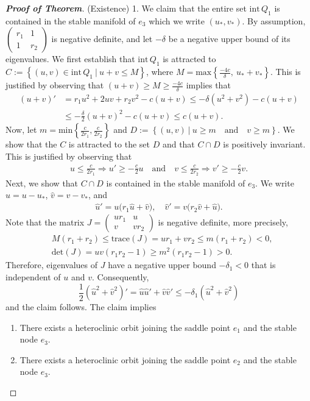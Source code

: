 \documentclass{amsart}
\theoremstyle{definition}
\numberwithin{equation}{section}
\def\ii{{\textrm{int}}\,}
\begin{document}
\begin{proof}[\textbf{Proof of Theorem}]
\bigskip 
(Existence) 1. We claim that the entire set $\ii Q_1$ is contained in the stable manifold of $e_3$ which we write $(u_*,v_*)$. By assumption, $\begin{pmatrix} r_1 & 1 \\ 1 & r_2 \end{pmatrix}$ is negative definite, and let $-\delta$ be a negative upper bound of its eigenvalues. We first establish that $\ii Q_1$ is attracted to $C:=\left\{(u,v)\in \ii Q_1 ~|~ u+ v \le M\right\}$, where $M=\textrm{max}\left\{\frac{-4c}{\delta}, \:u_*+ v_*\right\}$. This is justified by observing that
$(u+ v) \ge M\ge \frac{-4c}{\delta}$ implies that
\begin{align*}
 (u+ v)' &= r_1 u^2 + 2uv + r_2 v^2 - c(u+v) \le -\delta (u^2 + v^2) - c(u+v)\\
  &\le -\frac{\delta}{2} (u+v)^2 - c(u+v) \le c(u+v).
\end{align*}
Now, let $m = \textrm{min}\left\{\frac{c}{2r_1},\frac{c}{2r_2}\right\}$ and $D:= \left\{(u,v)~|~  u \ge m \quad \text{and} \quad  v \ge m\right\}.$ We show that the $C$ is attracted to the set $D$ and that $C \cap D$ is positively invariant. This is justified by observing that
\begin{align*}
 u \le \frac{c}{2r_1} \Longrightarrow u' \ge -\frac{c}{2} u \quad \text{and} \quad
 v \le \frac{c}{2r_2} \Longrightarrow v' \ge -\frac{c}{2} v.
 \end{align*}
Next, we show that $C\cap D$ is contained in the stable manifold of $e_3$. We write $\hat u = u -  u_*$, $\hat v =  v -  v_*$, and 
\begin{align*}
 \hat u' =  u \big(r_1 \hat u + \hat v\big), \quad 
 \hat v' =  v \big(r_2 \hat v + \hat u\big).
\end{align*}
Note that the matrix $J=\begin{pmatrix}  ur_1 &  u \\  v &  vr_2 \end{pmatrix}$ is negative definite, more precisely,
\begin{align*}
 & M(r_1+r_2)\le \textrm{trace}(J) = ur_1 + vr_2 \le m(r_1+ r_2) < 0, \\
 &\textrm{det}(J) = uv(r_1r_2-1) \ge m^2(r_1r_2-1) > 0.
\end{align*}
Therefore, eigenvalues of $J$ have a negative upper bound $-\delta_1<0$ that is independent of $u$ and $v$. Consequently, 
$$ \frac{1}{2} (\hat{u}^2 +  \hat{v}^2)' = \hat u \hat u' + \hat v \hat v' \le -\delta_1 (\hat{u}^2 + \hat{v}^2) $$%
and the claim follows. The claim implies
\begin{enumerate}
 \item There exists a heteroclinic orbit joining the saddle point $e_1$ and the stable node $e_3$.
 \item There exists a heteroclinic orbit joining the saddle point $e_2$ and the stable node $e_3$.
\end{enumerate}


\end{proof}
\end{document}
